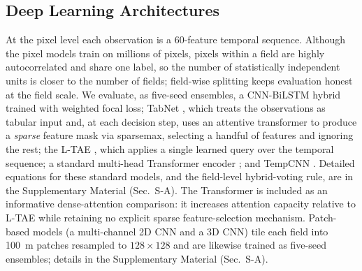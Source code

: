 \documentclass[preprint,authoryear]{elsarticle}
\begin{document}
\subsection{Deep Learning Architectures}
At the pixel level each observation is a 60-feature temporal sequence. Although the pixel models train on millions of pixels, pixels within a field are highly autocorrelated and share one label, so the number of statistically independent units is closer to the number of fields; field-wise splitting keeps evaluation honest at the field scale. We evaluate, as five-seed ensembles, a CNN-BiLSTM hybrid trained with weighted focal loss; TabNet \citep{tabnet_orig, tabnet2024}, which treats the observations as tabular input and, at each decision step, uses an attentive transformer to produce a \emph{sparse} feature mask via sparsemax, selecting a handful of features and ignoring the rest; the L-TAE \citep{ltae2020}, which applies a single learned query over the temporal sequence; a standard multi-head Transformer encoder \citep{vaswani2017, russwurm2020}; and TempCNN \citep{tempcnn2019}. Detailed equations for these standard models, and the field-level hybrid-voting rule, are in the Supplementary Material (Sec.~S-A). The Transformer is included as an informative dense-attention comparison: it increases attention capacity relative to L-TAE while retaining no explicit sparse feature-selection mechanism. Patch-based models (a multi-channel 2D CNN and a 3D CNN) tile each field into 100~m patches resampled to $128\times128$ and are likewise trained as five-seed ensembles; details in the Supplementary Material (Sec.~S-A).
\end{document}
